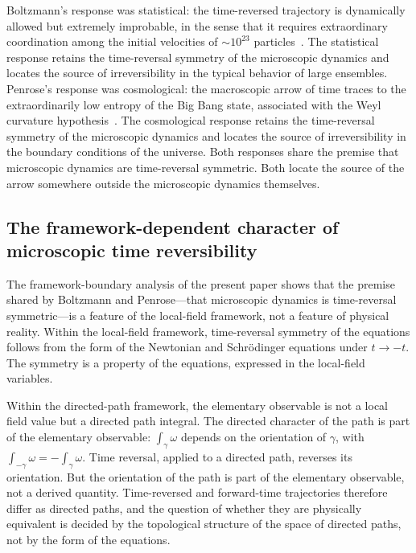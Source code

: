 \documentclass[%
 reprint, amsmath,amssymb, aps, prb, ]{revtex4-2}
\numberwithin{equation}{section}
\begin{document}
Boltzmann's response was statistical: the time-reversed trajectory is dynamically allowed but extremely improbable, in the sense that it requires extraordinary coordination among the initial velocities of $\sim 10^{23}$ particles~\cite{Boltzmann1872}. The statistical response retains the time-reversal symmetry of the microscopic dynamics and locates the source of irreversibility in the typical behavior of large ensembles. Penrose's response was cosmological: the macroscopic arrow of time traces to the extraordinarily low entropy of the Big Bang state, associated with the Weyl curvature hypothesis~\cite{Penrose1989}. The cosmological response retains the time-reversal symmetry of the microscopic dynamics and locates the source of irreversibility in the boundary conditions of the universe. Both responses share the premise that microscopic dynamics are time-reversal symmetric. Both locate the source of the arrow somewhere outside the microscopic dynamics themselves.

\subsection{The framework-dependent character of microscopic time reversibility}
\label{sec:framework_dependent}

The framework-boundary analysis of the present paper shows that the premise shared by Boltzmann and Penrose---that microscopic dynamics is time-reversal symmetric---is a feature of the local-field framework, not a feature of physical reality. Within the local-field framework, time-reversal symmetry of the equations follows from the form of the Newtonian and Schr\"odinger equations under $t \to -t$. The symmetry is a property of the equations, expressed in the local-field variables.

Within the directed-path framework, the elementary observable is not a local field value but a directed path integral. The directed character of the path is part of the elementary observable: $\int_\gamma \omega$ depends on the orientation of $\gamma$, with $\int_{-\gamma}\omega = -\int_\gamma \omega$. Time reversal, applied to a directed path, reverses its orientation. But the orientation of the path is part of the elementary observable, not a derived quantity. Time-reversed and forward-time trajectories therefore differ as directed paths, and the question of whether they are physically equivalent is decided by the topological structure of the space of directed paths, not by the form of the equations.
\end{document}
